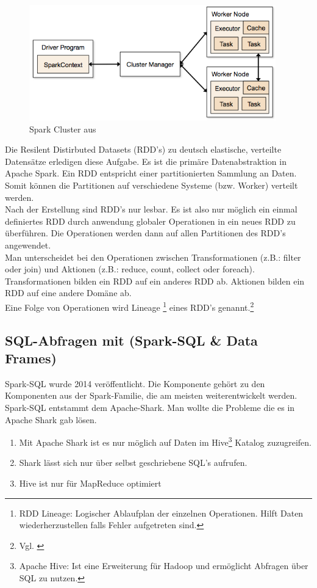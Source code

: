 \begin{figure}[h]
  \centering
  \includegraphics[width=\textwidth,height=50mm]{./bilder/cluster-overview.png}
  \caption{Spark Cluster aus \cite{SPCLUSTER}}\label{fig:spark_cluster}
\end{figure}



\noindent
Die Resilent Distirbuted Datasets (RDD's) zu deutsch elastische, verteilte Datensätze erledigen diese Aufgabe. Es ist die primäre Datenabstraktion in Apache Spark. 
Ein RDD entspricht einer partitionierten Sammlung an Daten. Somit können die Partitionen auf verschiedene Systeme (bzw. Worker) verteilt werden.  \\
Nach der Erstellung sind RDD's nur lesbar. Es ist also nur möglich ein einmal definiertes RDD durch anwendung globaler Operationen in ein neues RDD zu überführen. Die Operationen werden dann auf allen Partitionen des RDD's angewendet. \\
\noindent
Man unterscheidet bei den Operationen zwischen Transformationen (z.B.: filter oder join) und Aktionen (z.B.: reduce, count, collect oder foreach). Transformationen bilden ein RDD auf ein anderes RDD ab. Aktionen bilden ein RDD auf eine andere Domäne ab.\\ %
\noindent
Eine Folge von Operationen wird Lineage \footnote{RDD Lineage: Logischer Ablaufplan der einzelnen Operationen. Hilft Daten wiederherzustellen falls Fehler aufgetreten sind.} eines RDD's genannt.\footnote{Vgl. \cite{ZC+12}}



\newpage
\subsection{SQL-Abfragen mit (Spark-SQL \& Data Frames)}

Spark-SQL wurde 2014 veröffentlicht. Die Komponente gehört zu den Komponenten aus der Spark-Familie, die am meisten weiterentwickelt werden.
Spark-SQL entstammt dem Apache-Shark. Man wollte die Probleme die es in Apache Shark gab lösen.
\begin{enumerate}
	\item Mit Apache Shark ist es nur möglich auf Daten im Hive\footnote{Apache Hive: Ist eine Erweiterung für Hadoop und ermöglicht Abfragen über SQL zu nutzen.} Katalog zuzugreifen. 
	\item Shark lässt sich nur über selbst geschriebene SQL's aufrufen. 
	\item Hive ist nur für MapReduce optimiert
\end{enumerate}

